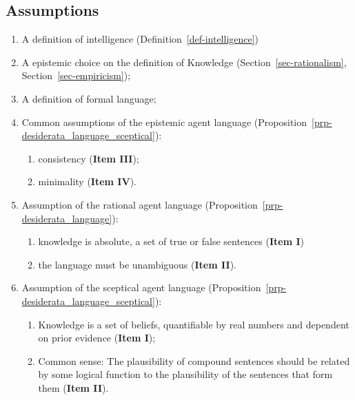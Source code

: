 \documentclass[
  letterpaper,
  12pt,
  british]{tufte-book}
\providecommand{\tightlist}{%
  \setlength{\itemsep}{0pt}\setlength{\parskip}{0pt}}\usepackage{longtable,booktabs,array}
\theoremstyle{plain}
\theoremstyle{definition}
\theoremstyle{plain}
\theoremstyle{remark}
\begin{document}
\hypertarget{assumptions-1}{%
\subsection{Assumptions}\label{assumptions-1}}

\begin{enumerate}
\def\labelenumi{\arabic{enumi}.}
\item
  A definition of intelligence (Definition~\ref{def-intelligence})
\item
  A epistemic choice on the definition of Knowledge
  (Section~\ref{sec-rationalism}, Section~\ref{sec-empiricism});
\item
  A definition of formal language;
\item
  Common assumptions of the epistemic agent language
  (Proposition~\ref{prp-desiderata_language_sceptical}):

  \begin{enumerate}
  \def\labelenumii{\arabic{enumii}.}
  \item
    consistency (\textbf{Item III});
  \item
    minimality (\textbf{Item IV}).
  \end{enumerate}
\item
  Assumption of the rational agent language
  (Proposition~\ref{prp-desiderata_language}):

  \begin{enumerate}
  \def\labelenumii{\roman{enumii}.}
  \tightlist
  \item
    knowledge is absolute, a set of true or false sentences
    (\textbf{Item I})
  \item
    the language must be unambiguous (\textbf{Item II}).
  \end{enumerate}
\item
  Assumption of the sceptical agent language
  (Proposition~\ref{prp-desiderata_language_sceptical}):

  \begin{enumerate}
  \def\labelenumii{\roman{enumii}.}
  \item
    Knowledge is a set of beliefs, quantifiable by real numbers and
    dependent on prior evidence (\textbf{Item I});
  \item
    Common sense: The plausibility of compound sentences should be
    related by some logical function to the plausibility of the
    sentences that form them (\textbf{Item II}).
  \end{enumerate}
\end{enumerate}
\end{document}
